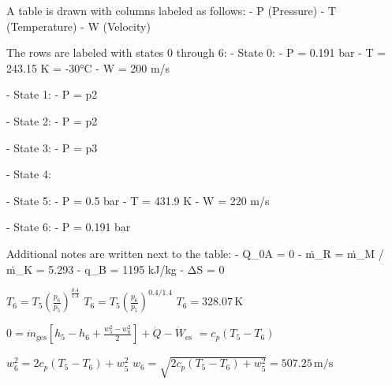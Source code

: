 A table is drawn with columns labeled as follows:  
- P (Pressure)  
- T (Temperature)  
- W (Velocity)  

The rows are labeled with states 0 through 6:  
- State 0:  
  - P = 0.191 bar  
  - T = 243.15 K = -30°C  
  - W = 200 m/s  

- State 1:  
  - P = p2  

- State 2:  
  - P = p2  

- State 3:  
  - P = p3  

- State 4:  

- State 5:  
  - P = 0.5 bar  
  - T = 431.9 K  
  - W = 220 m/s  

- State 6:  
  - P = 0.191 bar  

Additional notes are written next to the table:  
- Q_0A = 0  
- ṁ_R = ṁ_M / ṁ_K = 5.293  
- q_B = 1195 kJ/kg  
- ΔS = 0

\( T_6 = T_5 \left( \frac{p_6}{p_5} \right)^{\frac{0.4}{1.4}} \)  
\( T_6 = T_5 \left( \frac{p_6}{p_5} \right)^{0.4 / 1.4} \)  
\( T_6 = 328.07 \, \text{K} \)  

\( 0 = \dot{m}_{\text{ges}} \left[ h_5 - h_6 + \frac{w_5^2 - w_6^2}{2} \right] + \dot{Q} - \dot{W}_{\text{es}} \)  
\( = c_p (T_5 - T_6) \)  

\( w_6^2 = 2 c_p (T_5 - T_6) + w_5^2 \)  
\( w_6 = \sqrt{2 c_p (T_5 - T_6) + w_5^2} = 507.25 \, \text{m/s} \)